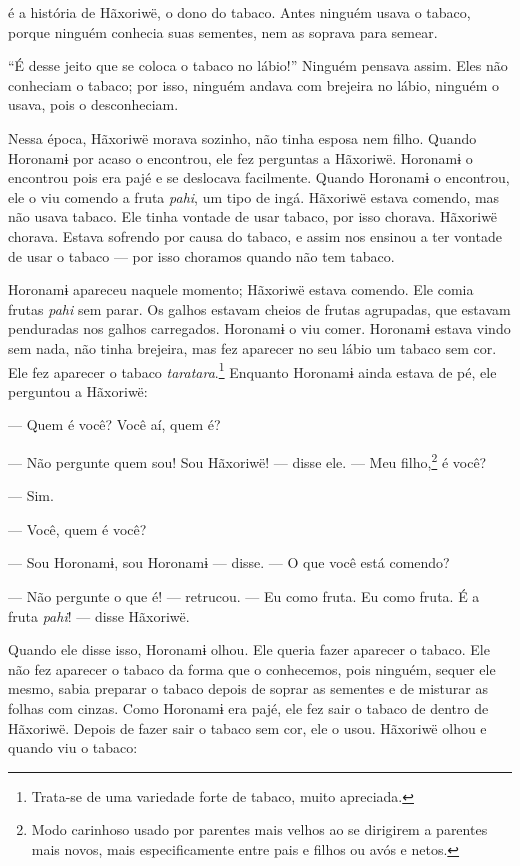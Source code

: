  é a história de Hãxoriwë, o dono do tabaco. Antes ninguém usava o
tabaco, porque ninguém conhecia suas sementes, nem as soprava para
semear. 

``É desse jeito que se coloca o tabaco no lábio!'' Ninguém pensava
 assim. Eles não conheciam o tabaco; por isso, ninguém andava com
 brejeira no lábio, ninguém o usava, pois o desconheciam. 

Nessa época, Hãxoriwë morava sozinho, não tinha esposa nem
filho. Quando Horonamɨ por acaso o encontrou, ele fez
perguntas a Hãxoriwë. Horonamɨ o encontrou pois era pajé e se deslocava
facilmente. Quando Horonamɨ o encontrou, ele o viu comendo a
fruta \textit{pahi}, um tipo de ingá. Hãxoriwë estava comendo, mas não
usava tabaco. Ele tinha vontade de usar tabaco, por isso chorava.
Hãxoriwë chorava. Estava sofrendo por causa do tabaco, e assim nos
ensinou a ter vontade de usar o tabaco --- por isso choramos quando não
tem tabaco. 

Horonamɨ apareceu naquele momento; Hãxoriwë estava comendo. Ele comia
frutas \textit{pahi} sem parar. Os galhos estavam cheios de frutas
agrupadas, que estavam penduradas nos galhos carregados. Horonamɨ o viu
comer. Horonamɨ estava vindo sem nada, não tinha brejeira, mas fez
aparecer no seu lábio um tabaco sem cor. Ele fez aparecer o
tabaco \textit{taratara}.\footnote{Trata-se de uma variedade forte de tabaco, muito apreciada.}  Enquanto Horonamɨ ainda estava
de pé, ele perguntou a Hãxoriwë: 

--- Quem é você? Você aí, quem é? 

--- Não pergunte quem sou! Sou Hãxoriwë! --- disse ele. --- Meu
filho,\footnote{Modo carinhoso usado por parentes mais velhos ao se dirigirem a
parentes mais novos, mais especificamente entre pais e filhos ou avós e
netos.} é você? 

--- Sim.

--- Você, quem é você?

--- Sou Horonamɨ, sou Horonamɨ --- disse. --- O que você está comendo? 

--- Não pergunte o que é! --- retrucou. --- Eu como fruta. Eu como
fruta. É a fruta \textit{pahi}! --- disse Hãxoriwë. 

Quando ele disse isso, Horonamɨ olhou. Ele queria fazer aparecer o
tabaco. Ele não fez aparecer o tabaco da forma que o conhecemos, pois
ninguém, sequer ele mesmo, sabia preparar o tabaco depois de soprar as
sementes e de misturar as folhas com cinzas. Como Horonamɨ era pajé, ele
fez sair o tabaco de dentro de Hãxoriwë. Depois de fazer sair o tabaco
sem cor, ele o usou. Hãxoriwë olhou e quando viu o tabaco: 

